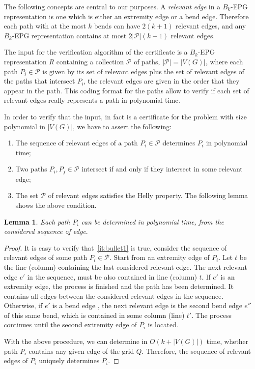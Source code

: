 \documentclass[preprint,12pt]{elsarticle} %
\newtheorem{lema}[theorem]{Lemma}
\begin{document}
The following concepts are central to our purposes. A \emph{relevant edge} in a  $B_k$-EPG representation is one which is either an extremity edge or a bend edge. Therefore each path with at the most $k$ bends can have $2(k+1)$ relevant edges, and any $B_k$-EPG representation contains at most $2|\mathcal{P}|(k+1)$ relevant edges.

The input for the verification algorithm of the certificate is a $B_k$-EPG representation $R$ containing a collection $\mathcal{P}$ of paths, $|\mathcal{P}|=|V(G)|$, where each path $P_i \in \mathcal{P}$ is given by its set of relevant edges plus the set of relevant edges of the paths that intersect $P_i$, the relevant edges are given in the order that they appear in the path. This coding format for the paths allow to verify if each set of relevant edges really represents a path in polynomial time.

In order to verify that the input, in fact is a certificate for the problem with size polynomial in $|V(G)|$, we have to assert the following:

\begin{enumerate}[label=(\roman*)]
\item The sequence of relevant edges of a path $P_i\in \mathcal{P}$ determines $P_i$ in polynomial time; \label{it:bullet1}

\item Two paths $P_i, P_j \in \mathcal{P}$ intersect if and only if they intersect in some relevant edge; \label{it:bullet2}

\item The set $\mathcal{P}$ of relevant edges satisfies the Helly property. The following lemma shows the above condition. \label{it:bullet3}
\end{enumerate}

\begin{lema}
Each path $P_i$ can be determined in polynomial time, from the considered sequence of edge.
\end{lema}

\begin{proof}
It is easy to verify that~\ref{it:bullet1} is true, consider the sequence of relevant edges of some path $P_i\in \mathcal{P}$. Start from an extremity edge of $P_i$. Let $t$ be the line (column) containing the last considered relevant edge. The next relevant edge $e'$ in the sequence, must be also contained in line (column) $t$. If $e'$ is an extremity edge, the process is finished and the path has been determined. It contains all edges between the considered relevant edges in the sequence. Otherwise, if $e'$ is a bend edge , the next relevant edge is the second bend edge $e''$ of this same bend, which is contained in some column (line) $t'$. The process continues until the second extremity edge of $P_i$ is located.   

With the above procedure, we can determine in $O(k+|V(G)|)$ time, whether path $P_i$ contains any given edge of the grid $Q$. Therefore, the sequence of relevant edges of $P_i$ uniquely determines $P_i$.
\end{proof}
\end{document}
